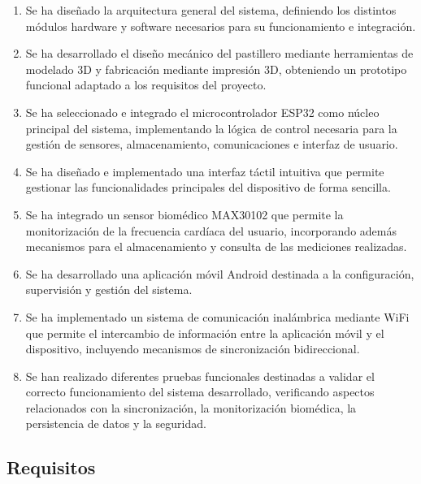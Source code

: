 \begin{enumerate}

\item Se ha diseñado la arquitectura general del sistema, definiendo los distintos módulos hardware y software necesarios para su funcionamiento e integración.

\item Se ha desarrollado el diseño mecánico del pastillero mediante herramientas de modelado 3D y fabricación mediante impresión 3D, obteniendo un prototipo funcional adaptado a los requisitos del proyecto.

\item Se ha seleccionado e integrado el microcontrolador ESP32 como núcleo principal del sistema, implementando la lógica de control necesaria para la gestión de sensores, almacenamiento, comunicaciones e interfaz de usuario.

\item Se ha diseñado e implementado una interfaz táctil intuitiva que permite gestionar las funcionalidades principales del dispositivo de forma sencilla.

\item Se ha integrado un sensor biomédico MAX30102 que permite la monitorización de la frecuencia cardíaca del usuario, incorporando además mecanismos para el almacenamiento y consulta de las mediciones realizadas.

\item Se ha desarrollado una aplicación móvil Android destinada a la configuración, supervisión y gestión del sistema.

\item Se ha implementado un sistema de comunicación inalámbrica mediante WiFi que permite el intercambio de información entre la aplicación móvil y el dispositivo, incluyendo mecanismos de sincronización bidireccional.

\item Se han realizado diferentes pruebas funcionales destinadas a validar el correcto funcionamiento del sistema desarrollado, verificando aspectos relacionados con la sincronización, la monitorización biomédica, la persistencia de datos y la seguridad.

\end{enumerate}

\subsection{Requisitos}

